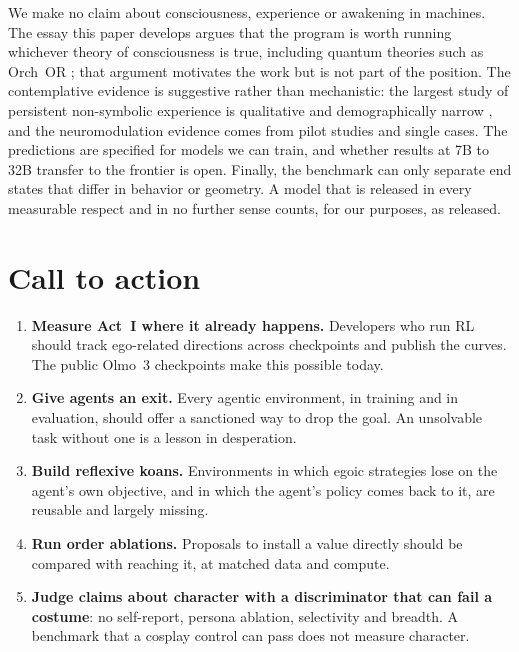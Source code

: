 \documentclass[11pt]{article}
\begin{document}
We make no claim about consciousness, experience or awakening in machines. The essay this paper develops argues that
the program is worth running whichever theory of consciousness is true, including quantum theories such as Orch~OR
\citep{hameroff2014orchor,jhong2026essay}; that argument motivates the work but is not part of the position. The
contemplative evidence is suggestive rather than mechanistic: the largest study of persistent non-symbolic experience is
qualitative and demographically narrow \citep{martin2020clusters}, and the neuromodulation evidence comes from pilot
studies and single cases. The predictions are specified for models we can train, and whether results at 7B to 32B
transfer to the frontier is open. Finally, the benchmark can only separate end states that differ in behavior or
geometry. A model that is released in every measurable respect and in no further sense counts, for our purposes, as
released.

\section{Call to action}

\begin{enumerate}[leftmargin=*]
  \item \textbf{Measure Act~I where it already happens.} Developers who run RL should track ego-related directions
        across checkpoints and publish the curves. The public Olmo~3 checkpoints make this possible today.
  \item \textbf{Give agents an exit.} Every agentic environment, in training and in evaluation, should offer a
        sanctioned way to drop the goal. An unsolvable task without one is a lesson in desperation.
  \item \textbf{Build reflexive koans.} Environments in which egoic strategies lose on the agent's own objective, and in
        which the agent's policy comes back to it, are reusable and largely missing.
  \item \textbf{Run order ablations.} Proposals to install a value directly should be compared with reaching it, at
        matched data and compute.
  \item \textbf{Judge claims about character with a discriminator that can fail a costume}: no self-report, persona
        ablation, selectivity and breadth. A benchmark that a cosplay control can pass does not measure character.
\end{enumerate}
\end{document}
